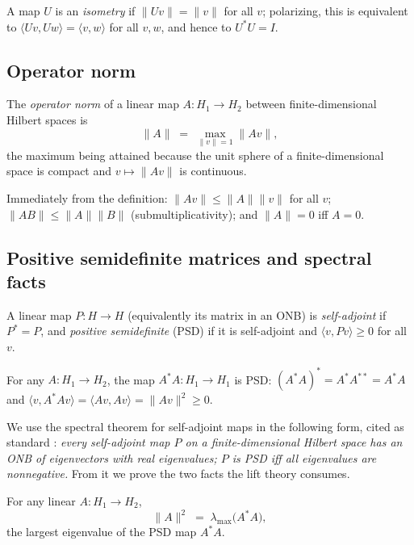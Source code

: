 A map $U$ is an \emph{isometry} if $\lVert U v \rVert = \lVert v \rVert$
for all $v$; polarizing, this is equivalent to
$\langle Uv, Uw \rangle = \langle v, w \rangle$ for all $v, w$, and hence
to $U^{*} U = I$.

\subsection{Operator norm}

\begin{definition}\label{ch02:def:opnorm}
The \emph{operator norm} of a linear map $A : H_1 \to H_2$ between
finite-dimensional Hilbert spaces is
\[
\lVert A \rVert \;=\; \max_{\lVert v \rVert = 1} \lVert A v \rVert,
\]
the maximum being attained because the unit sphere of a finite-dimensional
space is compact and $v \mapsto \lVert A v \rVert$ is continuous.
\end{definition}

Immediately from the definition: $\lVert A v \rVert \leq \lVert A \rVert
\lVert v \rVert$ for all $v$; $\lVert A B \rVert \leq \lVert A \rVert
\lVert B \rVert$ (submultiplicativity); and $\lVert A \rVert = 0$ iff
$A = 0$.

\subsection{Positive semidefinite matrices and spectral facts}

\begin{definition}\label{ch02:def:psd}
A linear map $P : H \to H$ (equivalently its matrix in an ONB) is
\emph{self-adjoint} if $P^{*} = P$, and \emph{positive semidefinite} (PSD)
if it is self-adjoint and $\langle v, P v \rangle \geq 0$ for all $v$.
\end{definition}

For any $A : H_1 \to H_2$, the map $A^{*} A : H_1 \to H_1$ is PSD:
$(A^{*}A)^{*} = A^{*} A^{**} = A^{*} A$ and
$\langle v, A^{*} A v \rangle = \langle A v, A v \rangle =
\lVert A v \rVert^2 \geq 0$.

We use the spectral theorem for self-adjoint maps in the following form,
cited as standard \cite{horn}: \emph{every self-adjoint map $P$ on a
finite-dimensional Hilbert space has an ONB of eigenvectors with real
eigenvalues; $P$ is PSD iff all eigenvalues are nonnegative.} From it we
prove the two facts the lift theory consumes.

\begin{proposition}\label{ch02:prop:norm-eig}
For any linear $A : H_1 \to H_2$,
\[
\lVert A \rVert^{2} \;=\; \lambda_{\max}\bigl(A^{*} A\bigr),
\]
the largest eigenvalue of the PSD map $A^{*} A$.
\end{proposition}

